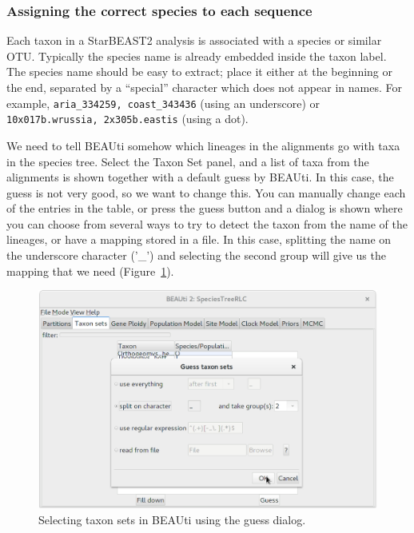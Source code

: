 \documentclass{article}
\begin{document}
\subsubsection*{Assigning the correct species to each sequence}

Each taxon in a StarBEAST2 analysis is associated with a species or similar OTU.
Typically the species name is already embedded inside the taxon label. The
species name should be easy to extract; place it either at the beginning or the
end, separated by a ``special'' character which does not appear in names. For
example, \texttt{aria\_334259, coast\_343436} (using an underscore) or
\texttt{10x017b.wrussia, 2x305b.eastis} (using a dot).

We need to tell BEAUti somehow which lineages in the alignments go with taxa in
the species tree. Select the Taxon Set panel, and a list of taxa from the
alignments is shown together with a default guess by BEAUti. In this case, the
guess is not very good, so we want to change this. You can manually change each
of the entries in the table, or press the guess button and a dialog is shown
where you can choose from several ways to try to detect the taxon from the name
of the lineages, or have a mapping stored in a file. In this case, splitting the
name on the underscore character ('\_') and selecting the second group will give
us the mapping that we need (Figure~\ref{fig:taxonSets}).

\begin{figure}[htb!]
\centering
\includegraphics[width=\textwidth]{figures/beauti-guess.png}
\caption{Selecting taxon sets in BEAUti using the guess dialog.}
\label{fig:taxonSets}
\end{figure}
\end{document}

